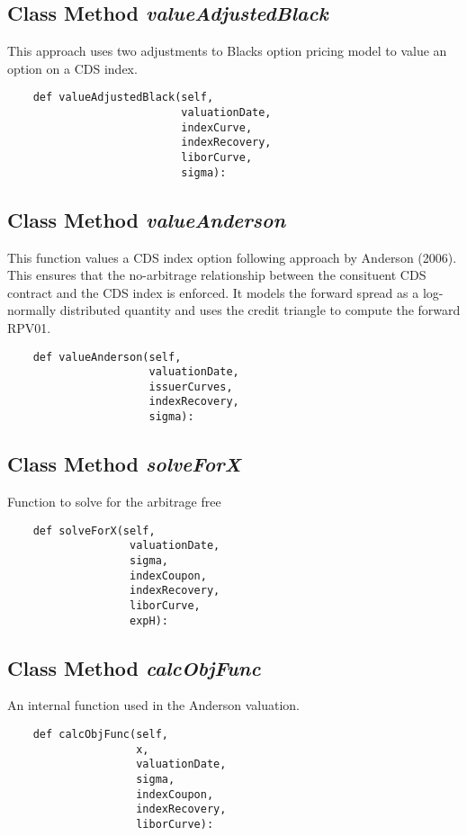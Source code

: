\documentclass[twoside,11pt]{book}
\begin{document}
\subsection{Class Method {\it valueAdjustedBlack}}
This approach uses two adjustments to Blacks option pricing model to value an option on a CDS index. 

\begin{lstlisting}
    def valueAdjustedBlack(self, 
                           valuationDate, 
                           indexCurve, 
                           indexRecovery,
                           liborCurve,
                           sigma):
\end{lstlisting}

\subsection{Class Method {\it valueAnderson}}
This function values a CDS index option following approach by Anderson (2006). This ensures that the no-arbitrage relationship between the consituent CDS contract and the CDS index is enforced. It models the forward spread as a log-normally distributed quantity and uses the credit triangle to compute the forward RPV01. 

\begin{lstlisting}
    def valueAnderson(self,
                      valuationDate,
                      issuerCurves,
                      indexRecovery,
                      sigma):
\end{lstlisting}

\subsection{Class Method {\it solveForX}}
Function to solve for the arbitrage free 

\begin{lstlisting}
    def solveForX(self,
                   valuationDate,
                   sigma,
                   indexCoupon,
                   indexRecovery,
                   liborCurve,
                   expH):
\end{lstlisting}

\subsection{Class Method {\it calcObjFunc}}
An internal function used in the Anderson valuation. 

\begin{lstlisting}
    def calcObjFunc(self,
                    x,
                    valuationDate,
                    sigma,
                    indexCoupon,
                    indexRecovery,
                    liborCurve):
\end{lstlisting}
\end{document}
